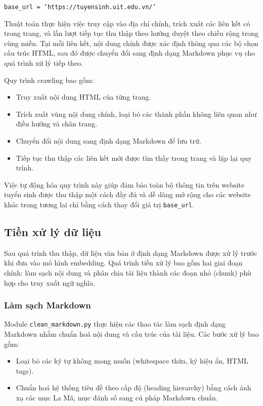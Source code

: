 \begin{center}
    \texttt{base\_url = `https://tuyensinh.uit.edu.vn/'}
\end{center}

Thuật toán thực hiện việc truy cập vào địa chỉ chính, trích xuất các liên kết có trong trang, và lần lượt tiếp tục thu thập theo hướng duyệt theo chiều rộng trong cùng miền. Tại mỗi liên kết, nội dung chính được xác định thông qua các bộ chọn cấu trúc HTML, sau đó được chuyển đổi sang định dạng Markdown phục vụ cho quá trình xử lý tiếp theo.

Quy trình crawling bao gồm:
\begin{itemize}
    \item Truy xuất nội dung HTML của từng trang.
    \item Trích xuất vùng nội dung chính, loại bỏ các thành phần không liên quan như điều hướng và chân trang.
    \item Chuyển đổi nội dung sang định dạng Markdown để lưu trữ.
    \item Tiếp tục thu thập các liên kết mới được tìm thấy trong trang và lặp lại quy trình.
\end{itemize}

Việc tự động hóa quy trình này giúp đảm bảo toàn bộ thông tin trên website tuyển sinh được thu thập một cách đầy đủ và dễ dàng mở rộng cho các website khác trong tương lai chỉ bằng cách thay đổi giá trị \texttt{base\_url}.


\subsection{Tiền xử lý dữ liệu}

Sau quá trình thu thập, dữ liệu văn bản ở định dạng Markdown được xử lý trước khi đưa vào mô hình embedding. Quá trình tiền xử lý bao gồm hai giai đoạn chính: làm sạch nội dung và phân chia tài liệu thành các đoạn nhỏ (chunk) phù hợp cho truy xuất ngữ nghĩa.

\subsubsection{Làm sạch Markdown}

Module \texttt{clean\_markdown.py} thực hiện các thao tác làm sạch định dạng Markdown nhằm chuẩn hoá nội dung và cấu trúc của tài liệu. Các bước xử lý bao gồm:

\begin{itemize}
    \item Loại bỏ các ký tự không mong muốn (whitespace thừa, ký hiệu ẩn, HTML tags).
    \item Chuẩn hoá hệ thống tiêu đề theo cấp độ (heading hierarchy) bằng cách ánh xạ các mục La Mã, mục đánh số sang cú pháp Markdown chuẩn.
\end{itemize}

